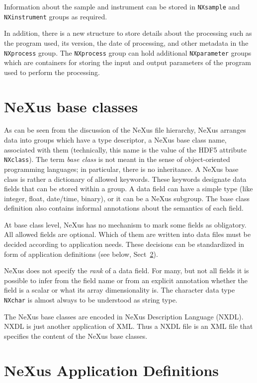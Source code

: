 \documentclass[%
 aip,
rsi,
 amsmath,amssymb,
 reprint,%
]{revtex4-1}
\begin{document}
Information about the sample and instrument can be stored in \texttt{NXsample} and \texttt{NXinstrument} groups as required. 

In addition, there is a new structure to store details about the processing such as the program used, its version, 
the date of processing, and other metadata 
in the \texttt{NXprocess} group. The \texttt{NXprocess} group can hold additional \texttt{NXparameter} groups which are containers 
for storing the input and output parameters of the program used to perform the processing. 


\section{NeXus base classes}

As can be seen from the discussion of the NeXus file hierarchy, NeXus arranges data into groups which have a 
type descriptor, a NeXus base class name, associated with them
(technically, this name is the value of the HDF5 attribute \texttt{NXclass}).
The term \emph{base class} is not meant in the sense of 
object-oriented programming languages;
in particular, there is no inheritance.
A NeXus base class is rather a dictionary of allowed keywords.
These keywords designate data fields that can be stored within a group.
A data field can have a simple type (like integer, float, date/time, binary),
or it can be a NeXus subgroup.
The base class definition also contains informal annotations
about the semantics of each field.

At base class level, NeXus has no mechanism to mark some fields as obligatory.
All allowed fields are optional.
Which of them are written into data files must be decided
according to application needs.
These decisions can be standardized in form of
application definitions (see below, Sect~\ref{sect_appdef}).

NeXus does not specify the \emph{rank} of a data field.
For many, but not all fields it is possible to infer from
the field name or from an explicit annotation
whether the field is a scalar or what its array dimensionality is.
The character data type \texttt{NXchar} is almost always to be
understood as string type.

The NeXus base classes are encoded in NeXus Description Language (NXDL)\cite{nxman}. NXDL is 
just another application of XML. Thus a NXDL file is an XML file that specifies the content of the NeXus base classes. 


\section{NeXus Application Definitions}
  \label{sect_appdef}
\end{document}
